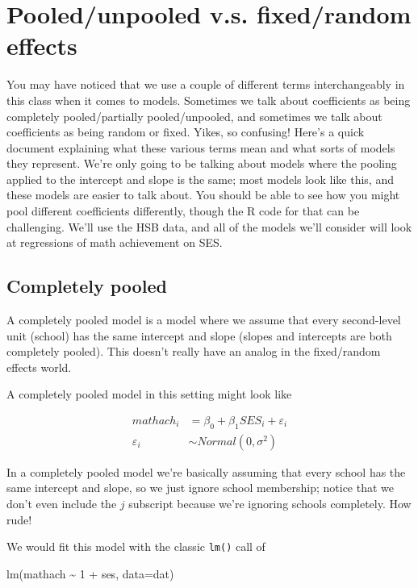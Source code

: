 \documentclass[
  letterpaper,
  DIV=11,
  numbers=noendperiod]{scrreprt}
\newenvironment{Shaded}{\begin{snugshade}}{\end{snugshade}}
\newcommand{\AttributeTok}[1]{\textcolor[rgb]{0.49,0.56,0.16}{#1}}
\newcommand{\DecValTok}[1]{\textcolor[rgb]{0.25,0.63,0.44}{#1}}
\newcommand{\FunctionTok}[1]{\textcolor[rgb]{0.02,0.16,0.49}{#1}}
\newcommand{\NormalTok}[1]{\textcolor[rgb]{0.00,0.44,0.13}{#1}}
\newcommand{\SpecialCharTok}[1]{\textcolor[rgb]{0.25,0.44,0.63}{#1}}
\begin{document}
\hypertarget{pooledunpooled-v.s.-fixedrandom-effects}{%
\section{Pooled/unpooled v.s. fixed/random
effects}\label{pooledunpooled-v.s.-fixedrandom-effects}}

You may have noticed that we use a couple of different terms
interchangeably in this class when it comes to models. Sometimes we talk
about coefficients as being completely pooled/partially pooled/unpooled,
and sometimes we talk about coefficients as being random or fixed.
Yikes, so confusing! Here's a quick document explaining what these
various terms mean and what sorts of models they represent. We're only
going to be talking about models where the pooling applied to the
intercept and slope is the same; most models look like this, and these
models are easier to talk about. You should be able to see how you might
pool different coefficients differently, though the R code for that can
be challenging. We'll use the HSB data, and all of the models we'll
consider will look at regressions of math achievement on SES.

\hypertarget{completely-pooled}{%
\subsection{Completely pooled}\label{completely-pooled}}

A completely pooled model is a model where we assume that every
second-level unit (school) has the same intercept and slope (slopes and
intercepts are both completely pooled). This doesn't really have an
analog in the fixed/random effects world.

A completely pooled model in this setting might look like

\[
\begin{aligned}
    mathach_i &= \beta_0 + \beta_1SES_i + \varepsilon_i \\
    \varepsilon_i &\sim Normal(0, \sigma^2)
\end{aligned}
\]

In a completely pooled model we're basically assuming that every school
has the same intercept and slope, so we just ignore school membership;
notice that we don't even include the \(j\) subscript because we're
ignoring schools completely. How rude!

We would fit this model with the classic \texttt{lm()} call of

\begin{Shaded}
\begin{Highlighting}[]
\FunctionTok{lm}\NormalTok{(mathach }\SpecialCharTok{\textasciitilde{}} \DecValTok{1} \SpecialCharTok{+}\NormalTok{ ses, }\AttributeTok{data=}\NormalTok{dat)}
\end{Highlighting}
\end{Shaded}
\end{document}

